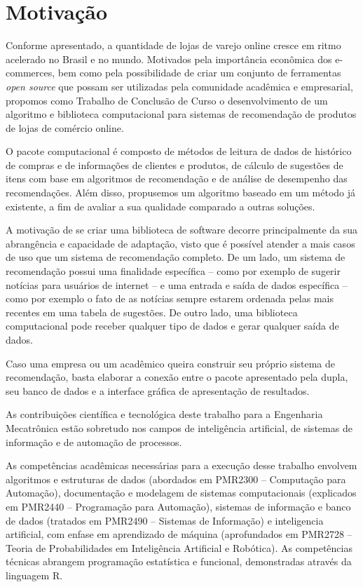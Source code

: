 \section{Motivação} %
\label{cha:motivacao}

Conforme apresentado, a quantidade de lojas de varejo online cresce em ritmo acelerado no Brasil e no mundo. Motivados pela importância econômica dos e-commerces, bem como pela possibilidade de criar um conjunto de ferramentas \textit{open source} que possam ser utilizadas pela comunidade acadêmica e empresarial, propomos como Trabalho de Conclusão de Curso o desenvolvimento de um algoritmo e biblioteca computacional para sistemas de recomendação de produtos de lojas de comércio online.

O pacote computacional é composto de métodos de leitura de dados de histórico de compras e de informações de clientes e produtos, de cálculo de sugestões de itens com base em algoritmos de recomendação e de análise de desempenho das recomendações. Além disso, propusemos um algoritmo baseado em um método já existente, a fim de avaliar a sua qualidade comparado a outras soluções.

A motivação de se criar uma biblioteca de software decorre principalmente da sua abrangência e capacidade de adaptação, visto que é possível atender a mais casos de uso que um sistema de recomendação completo. De um lado, um sistema de recomendação possui uma finalidade específica -- como por exemplo de sugerir notícias para usuários de internet -- e uma entrada e saída de dados específica -- como por exemplo o fato de as notícias sempre estarem ordenada pelas mais recentes em uma tabela de sugestões. De outro lado, uma biblioteca computacional pode receber qualquer tipo de dados e gerar qualquer saída de dados. 

Caso uma empresa ou um acadêmico queira construir seu próprio sistema de recomendação, basta elaborar a conexão entre o pacote apresentado pela dupla, seu banco de dados e a interface gráfica de apresentação de resultados.

As contribuições científica e tecnológica deste trabalho para a Engenharia Mecatrônica estão sobretudo nos campos de inteligência artificial, de sistemas de informação e de automação de processos.

As competências acadêmicas necessárias para a execução desse trabalho envolvem algoritmos e estruturas de dados (abordados em PMR2300 -- Computação para Automação), documentação e modelagem de sistemas computacionais (explicados em PMR2440 -- Programação para Automação), sistemas de informação e banco de dados (tratados em PMR2490 -- Sistemas de Informação) e inteligencia artificial, com enfase em aprendizado de máquina (aprofundados em PMR2728 -- Teoria de Probabilidades em Inteligência Artificial e Robótica). As competências técnicas abrangem programação estatística e funcional, demonstradas através da linguagem R.

